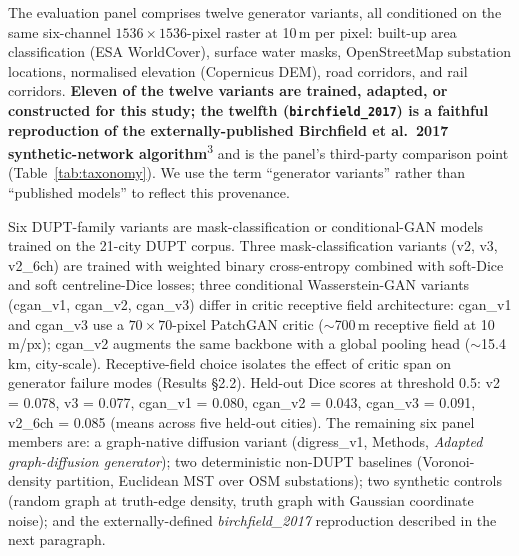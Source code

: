 \documentclass[10pt,a4paper]{article}
\begin{document}
The evaluation panel comprises twelve generator variants, all
conditioned on the same six-channel $1536\times1536$-pixel raster
at 10\,m per pixel: built-up area classification (ESA WorldCover),
surface water masks, OpenStreetMap substation locations,
normalised elevation (Copernicus DEM), road corridors, and rail
corridors. \textbf{Eleven of the twelve variants are trained,
adapted, or constructed for this study; the twelfth
(\texttt{birchfield\_2017}) is a faithful reproduction of the
externally-published Birchfield et al.\ 2017 synthetic-network
algorithm}\textsuperscript{3} and is the panel's third-party
comparison point (Table~\ref{tab:taxonomy}). We use the term
``generator variants'' rather than ``published models'' to
reflect this provenance.

Six DUPT-family variants are mask-classification or
conditional-GAN models trained on the 21-city DUPT corpus.
Three mask-classification variants (v2, v3, v2\_6ch) are
trained with weighted binary cross-entropy combined with soft-Dice
and soft centreline-Dice losses; three conditional
Wasserstein-GAN variants (cgan\_v1, cgan\_v2, cgan\_v3) differ in
critic receptive field architecture: cgan\_v1 and cgan\_v3 use a
$70 \times 70$-pixel PatchGAN critic ($\sim$700\,m receptive field
at 10\,m/px); cgan\_v2 augments the same backbone with a global
pooling head ($\sim$15.4\,km, city-scale). Receptive-field choice
isolates the effect of critic span on generator failure modes
(Results §2.2). Held-out Dice scores at threshold 0.5:
v2 = 0.078, v3 = 0.077, cgan\_v1 = 0.080, cgan\_v2 = 0.043,
cgan\_v3 = 0.091, v2\_6ch = 0.085 (means across five held-out
cities). The remaining six panel members are: a graph-native
diffusion variant (digress\_v1, Methods, \emph{Adapted
graph-diffusion generator}); two deterministic non-DUPT baselines
(Voronoi-density partition, Euclidean MST over OSM substations);
two synthetic controls (random graph at truth-edge density,
truth graph with Gaussian coordinate noise); and the externally-defined
\emph{birchfield\_2017} reproduction described in the next
paragraph.
\end{document}

